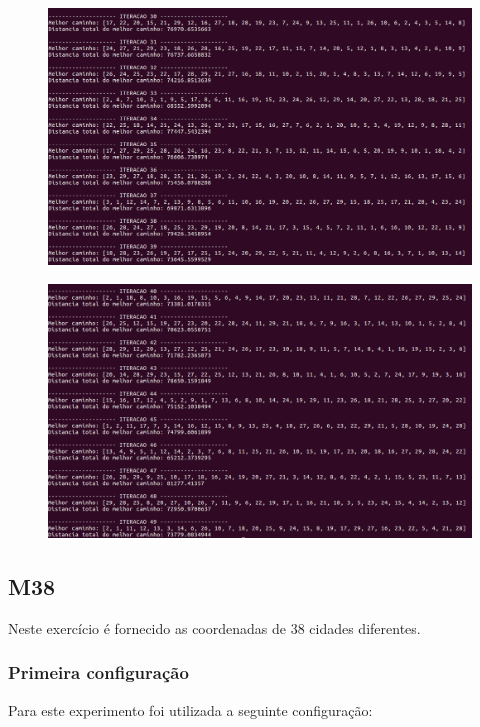 \documentclass[hidelinks,12pt]{article}
\begin{document}
		\newpage

		\begin{figure}[!h]
			\centering
			\includegraphics[scale=0.4]{Figures/m29-2-4.png}
		\end{figure}

		\newpage

		\begin{figure}[!h]
			\centering
			\includegraphics[scale=0.4]{Figures/m29-2-5.png}
		\end{figure}

		\newpage		
	
	\subsection{M38}
			Neste exercício é fornecido as coordenadas de 38 cidades diferentes.	
		\subsubsection{Primeira configuração}
		 	Para este experimento foi utilizada a seguinte configuração:
\end{document}

